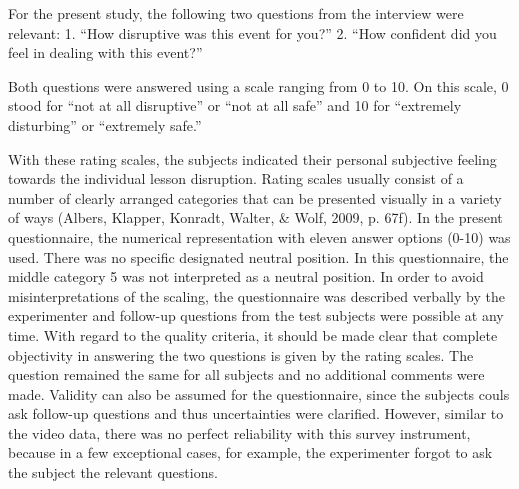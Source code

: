 \documentclass[
  man]{apa6}
\begin{document}
For the present study, the following two questions from the interview were relevant:
1. ``How disruptive was this event for you?''
2. ``How confident did you feel in dealing with this event?''

Both questions were answered using a scale ranging from 0 to 10. On this scale, 0 stood for ``not at all disruptive'' or ``not at all safe'' and 10 for ``extremely disturbing'' or ``extremely safe.''

With these rating scales, the subjects indicated their personal subjective feeling towards the individual lesson disruption. Rating scales usually consist of a number of clearly arranged categories that can be presented visually in a variety of ways (Albers, Klapper, Konradt, Walter, \& Wolf, 2009, p. 67f). In the present questionnaire, the numerical representation with eleven answer options (0-10) was used. There was no specific designated neutral position. In this questionnaire, the middle category 5 was not interpreted as a neutral position. In order to avoid misinterpretations of the scaling, the questionnaire was described verbally by the experimenter and follow-up questions from the test subjects were possible at any time. With regard to the quality criteria, it should be made clear that complete objectivity in answering the two questions is given by the rating scales. The question remained the same for all subjects and no additional comments were made. Validity can also be assumed for the questionnaire, since the subjects couls ask follow-up questions and thus uncertainties were clarified. However, similar to the video data, there was no perfect reliability with this survey instrument, because in a few exceptional cases, for example, the experimenter forgot to ask the subject the relevant questions.
\end{document}
